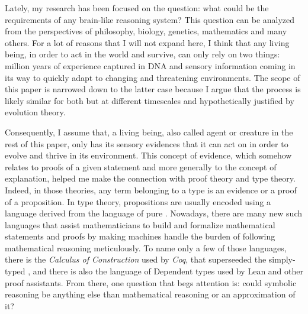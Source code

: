 Lately, my research has been focused on the question: what could be the requirements of any brain-like reasoning system? This question can be analyzed from the perspectives of philosophy, biology, genetics, mathematics and many others. For a lot of reasons that I will not expand here, I think that any living being, in order to act in the world and survive, can only rely on two things: million years of experience captured in DNA and sensory information coming in its way to quickly adapt to changing and threatening environments. The scope of this paper is narrowed down to the latter case because I argue that the process is likely similar for both but at different timescales and hypothetically justified by evolution theory.

Consequently, I assume that, a living being, also called agent or creature in the rest of this paper, only has its sensory evidences that it can act on in order to evolve and thrive in its environment. This concept of evidence, which somehow relates to proofs of a given statement and more generally to the concept of explanation, helped me make the connection with proof theory and type theory. Indeed, in those theories, any term belonging to a type is an evidence or a proof of a proposition. In type theory, propositions are usually encoded using a language derived from the language of pure \lambdacalc. Nowadays, there are many new such languages that assist mathematicians to build and formalize mathematical statements and proofs by making machines handle the burden of following mathematical reasoning meticulously. To name only a few of those languages, there is the \textit{Calculus of Construction} used by \textit{Coq}, that superseeded the simply-typed \lambdacalc, and there is also the language of Dependent types used by Lean and other proof assistants. From there, one question that begs attention is: could symbolic reasoning be anything else than mathematical reasoning or an approximation of it?

